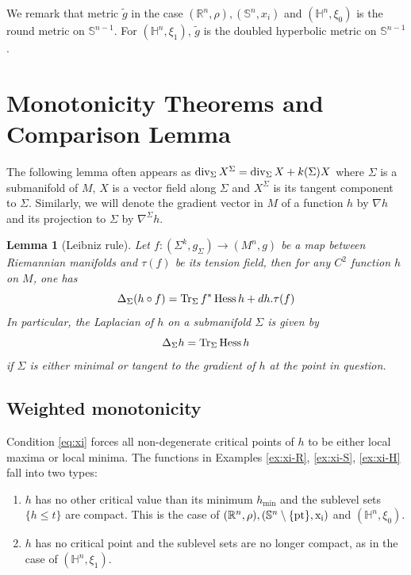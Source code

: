 \documentclass[11pt]{article}
\newtheorem{lemma}[theorem]{Lemma}
\newcommand{\tr}{\mathop{\rm Tr}\nolimits}
\newcommand{\dive}{\mathop{\rm div}\nolimits}
\DeclareMathOperator{\hess}{Hess}
\begin{document}
We remark that metric \(\tilde g\) in the case \((\mathbb{R}^n, \rho), (\mathbb{S}^n, x_i)\) and
   \((\mathbb{H}^n, \xi_0)\) is the round metric on \(\mathbb{S}^{n-1}\). For \((\mathbb{H}^n, \xi_1)\), \(\tilde g\)
   is the doubled hyperbolic metric on \(\mathbb{S}^{n-1}\). 

\section{Monotonicity Theorems and Comparison Lemma}
\label{sec:orga12f250}

The following lemma often appears as \(\dive_\Sigma X^\Sigma = \dive_\Sigma X + k(\Sigma)X\) where \(\Sigma\) is a submanifold of \(M\), \(X\) is a vector
field along \(\Sigma\) and \(X^\Sigma\) is its tangent component to \(\Sigma\). Similarly, we will denote the gradient vector in \(M\) of a function \(h\) by \(\nabla
h\) and its projection to \(\Sigma\) by \(\nabla^\Sigma h\).
\begin{lemma}[Leibniz rule]
\label{lem:chain-rule}
Let \(f:(\Sigma^k,g_\Sigma) \longrightarrow (M^n, g)\) be a map between Riemannian manifolds and \(\tau(f)\) be its tension
field, then for any \(C^2\) function \(h\) on \(M\), one has
\begin{equation}
\label{eq:chain-rule}
\Delta_{\Sigma} (h\circ f) = \tr_{\Sigma} f^*\hess h + dh.\tau(f)
\end{equation}
In particular, the Laplacian of \(h\) on a submanifold \(\Sigma\) is given by 
\begin{equation}
\label{eq:hess-lap}
\Delta_\Sigma h = \tr_\Sigma \hess h  
\end{equation} 
if \(\Sigma\) is either minimal or tangent to the gradient of \(h\) at the point in question.
\end{lemma}

\subsection{Weighted monotonicity}
\label{sec:org98d5763}

Condition \eqref{eq:xi} forces all non-degenerate critical points of \(h\) to be either
 local maxima or local minima. The functions in Examples \ref{ex:xi-R},
\ref{ex:xi-S}, \ref{ex:xi-H} fall into two types:
\begin{enumerate}
\item \(h\) has no other critical value than its minimum \(h_{\min}\) and the sublevel sets
\(\{h\leq t\}\) are compact. 
This is the case of \((\mathbb{R}^n,\rho), (\mathbb{S}^n\setminus\{\rm pt\},x_i)\) and \((\mathbb{H}^n,\xi_0)\).
\item \(h\) has no critical point and the sublevel sets are no longer
compact, as in the case of \((\mathbb{H}^n,\xi_1)\).
\end{enumerate}
\end{document}
